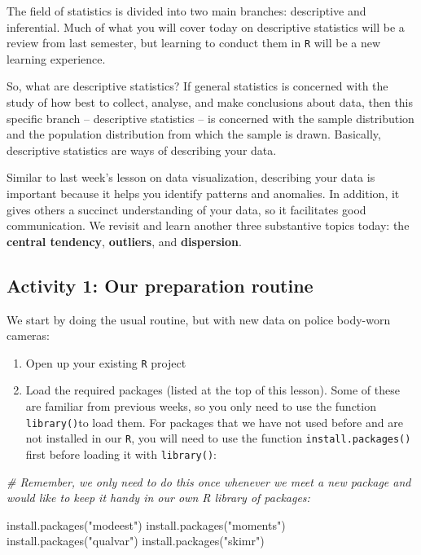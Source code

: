 \documentclass[
]{book}
\newenvironment{Shaded}{\begin{snugshade}}{\end{snugshade}}
\newcommand{\CommentTok}[1]{\textcolor[rgb]{0.56,0.35,0.01}{\textit{#1}}}
\newcommand{\FunctionTok}[1]{\textcolor[rgb]{0.00,0.00,0.00}{#1}}
\newcommand{\NormalTok}[1]{#1}
\newcommand{\StringTok}[1]{\textcolor[rgb]{0.31,0.60,0.02}{#1}}
\begin{document}
The field of statistics is divided into two main branches: descriptive and inferential. Much of what you will cover today on descriptive statistics will be a review from last semester, but learning to conduct them in \texttt{R} will be a new learning experience.

So, what are descriptive statistics? If general statistics is concerned with the study of how best to collect, analyse, and make conclusions about data, then this specific branch -- descriptive statistics -- is concerned with the sample distribution and the population distribution from which the sample is drawn. Basically, descriptive statistics are ways of describing your data.

Similar to last week's lesson on data visualization, describing your data is important because it helps you identify patterns and anomalies. In addition, it gives others a succinct understanding of your data, so it facilitates good communication. We revisit and learn another three substantive topics today: the \textbf{central tendency}, \textbf{outliers}, and \textbf{dispersion}.

\hypertarget{activity-1-our-preparation-routine}{%
\subsection{Activity 1: Our preparation routine}\label{activity-1-our-preparation-routine}}

We start by doing the usual routine, but with new data on police body-worn cameras:

\begin{enumerate}
\def\labelenumi{\arabic{enumi}.}
\item
  Open up your existing \texttt{R} project
\item
  Load the required packages (listed at the top of this lesson). Some of these are familiar from previous weeks, so you only need to use the function \texttt{library()}to load them. For packages that we have not used before and are not installed in our \texttt{R}, you will need to use the function \texttt{install.packages()} first before loading it with \texttt{library()}:
\end{enumerate}

\begin{Shaded}
\begin{Highlighting}[]
\CommentTok{\# Remember, we only need to do this once whenever we meet a new package and would like to keep it handy in our own R library of packages:}

\FunctionTok{install.packages}\NormalTok{(}\StringTok{"modeest"}\NormalTok{)}
\FunctionTok{install.packages}\NormalTok{(}\StringTok{"moments"}\NormalTok{)}
\FunctionTok{install.packages}\NormalTok{(}\StringTok{"qualvar"}\NormalTok{)}
\FunctionTok{install.packages}\NormalTok{(}\StringTok{"skimr"}\NormalTok{)}
\end{Highlighting}
\end{Shaded}
\end{document}
